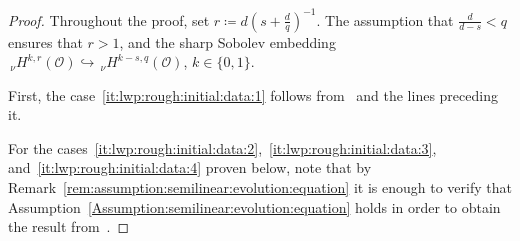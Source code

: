 \documentclass[reqno]{amsart}
\newcommand{\sO}{\mathscr{O}}
\newcommand{\ce}{\coloneqq}
\newcommand{\1}{\mathbf{1}}
\newcommand{\nH}{\ensuremath{\,_\nu H}}
\newcommand{\bpsn}[1]{\ensuremath{\nH^{#1}(\sO)}}
\begin{document}
	\begin{proof}
     Throughout the proof, set $r\ce d(s+\frac{d}{q})^{-1}$. The assumption that $\frac{d}{d-s}<q$ ensures that $r>1$, and the sharp Sobolev embedding $\bpsn{k,r}\hookrightarrow \bpsn{k-s,q}$,  $k\in \{0,1\}$.
     
		First, the case~\ref{it:lwp:rough:initial:data:1} follows from~\cite[Theorem 7.9]{agrestiNonlinearParabolicStochastic2022} and the lines preceding it. 

    For the cases~\ref{it:lwp:rough:initial:data:2},~\ref{it:lwp:rough:initial:data:3}, and~\ref{it:lwp:rough:initial:data:4} proven below, note that by  Remark~\ref{rem:assumption:semilinear:evolution:equation} it is enough to verify that Assumption~\ref{Assumption:semilinear:evolution:equation} holds in order to obtain the result from~\cite[Theorem~4.3]{agrestiNonlinearParabolicStochastic2022a}. 
        
		


\end{proof}
\end{document}
